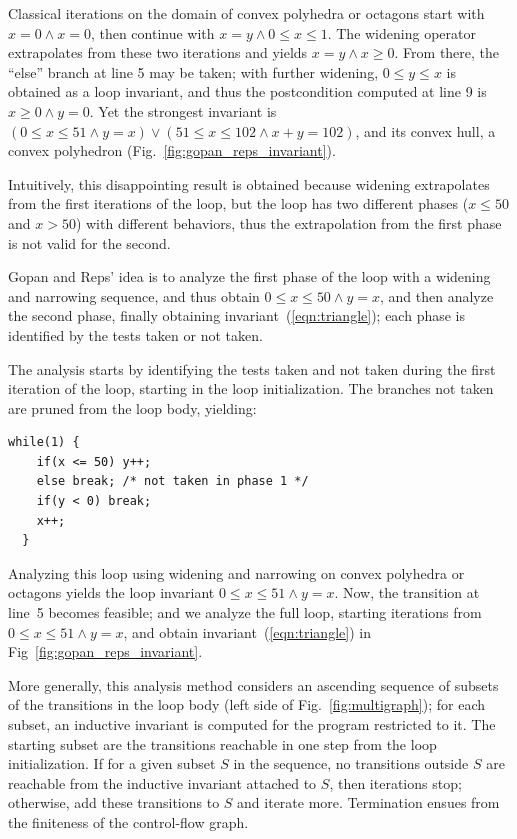 \documentclass{llncs}
\newcommand{\avirer}[1]{{\color{red} #1}}
\newcommand{\avirer}[1]{}
\begin{document}
Classical iterations on the domain of convex polyhedra \cite{CousotHalbwachs78,BagnaraHRZ05SCP} or octagons \cite{DBLP:journals/lisp/Mine06} start with $x = 0 \land x = 0$, then continue with $x = y \land 0 \leq x \leq 1$.
The widening operator extrapolates from these two iterations and yields $x = y \land x \geq 0$.
From there, the ``else'' branch at line 5 may be taken; with further widening, $0 \leq y \leq x$ is obtained as a loop invariant, and thus the postcondition computed at line 9 is $x \geq 0 \land y = 0$.
Yet the strongest invariant is $(0 \leq x \leq 51 \land y = x) \lor (51 \leq x \leq 102 \land x+y=102)$, and its convex hull, a convex polyhedron (Fig.~\ref{fig:gopan_reps_invariant}).

Intuitively, this disappointing result is obtained because widening extrapolates from the first iterations of the loop, but the loop has two different phases ($x \leq 50$ and $x > 50$) with different behaviors, thus the extrapolation from the first phase is not valid for the second.

Gopan and Reps' idea is to analyze the first phase of the loop with a widening and narrowing sequence, and thus obtain $0 \leq x \leq 50 \land y = x$, and then analyze the second phase, finally obtaining invariant~(\ref{eqn:triangle}); each phase is identified by the tests taken or not taken.

The analysis starts by identifying the tests taken and not taken during the first iteration of the loop, starting in the loop initialization. The branches not taken are pruned from the loop body, yielding:
\begin{lstlisting}[numbers=none]
  while(1) {
    if(x <= 50) y++;
    else break; /* not taken in phase 1 */
    if(y < 0) break;
    x++;
  }
\end{lstlisting}

Analyzing this loop using widening and narrowing on convex polyhedra
or octagons yields the loop invariant $0 \leq x \leq 51 \land y = x$.
Now, the transition at line~5 becomes feasible; and we analyze the
full loop, starting iterations from $0 \leq x \leq 51 \land y = x$,
and obtain invariant~(\ref{eqn:triangle}) in Fig~\ref{fig:gopan_reps_invariant}.

More generally, this analysis method considers an ascending sequence of subsets of the transitions in the loop body \avirer{(left side of Fig.~\ref{fig:multigraph})};
for each subset, an inductive invariant is computed for the program restricted to it.
The starting subset are the transitions reachable in one step from the loop initialization.
If for a given subset $S$ in the sequence, no transitions outside $S$ are reachable from the inductive invariant attached to $S$, then iterations stop;
otherwise, add these transitions to $S$ and iterate more.
Termination ensues from the finiteness of the control-flow graph.
\end{document}
